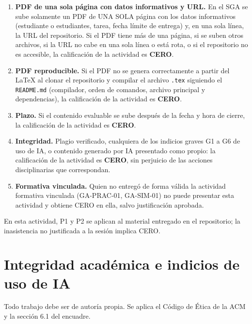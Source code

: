 \documentclass[11pt]{article}
\newcommand{\seccion}[1]{\section{\textcolor{utegreendk}{#1}}}
\begin{document}
\begin{cajapiso}[title={Criterios de piso: su incumplimiento implica calificación CERO en la actividad}]
	\begin{enumerate}[label=\textbf{P\arabic*.},leftmargin=24pt,itemsep=3pt]
		\item \textbf{PDF de una sola página con datos informativos y URL.} En el SGA se sube solamente un PDF de UNA SOLA página con los datos informativos (estudiante o estudiantes, tarea, fecha límite de entrega) y, en una sola línea, la URL del repositorio. Si el PDF tiene más de una página, si se suben otros archivos, si la URL no cabe en una sola línea o está rota, o si el repositorio no es accesible, la calificación de la actividad es \textbf{CERO}.
		\item \textbf{PDF reproducible.} Si el PDF no se genera correctamente a partir del \LaTeX{} al clonar el repositorio y compilar el archivo \texttt{.tex} siguiendo el \texttt{README.md} (compilador, orden de comandos, archivo principal y dependencias), la calificación de la actividad es \textbf{CERO}.
		\item \textbf{Plazo.} Si el contenido evaluable se sube después de la fecha y hora de cierre, la calificación de la actividad es \textbf{CERO}.
		\item \textbf{Integridad.} Plagio verificado, cualquiera de los indicios graves G1 a G6 de uso de IA, o contenido generado por IA presentado como propio: la calificación de la actividad es \textbf{CERO}, sin perjuicio de las acciones disciplinarias que correspondan.
		\item \textbf{Formativa vinculada.} Quien no entregó de forma válida la actividad formativa vinculada (GA-PRAC-01, GA-SIM-01) no puede presentar esta actividad y obtiene CERO en ella, salvo justificación aprobada.
	\end{enumerate}
	En esta actividad, P1 y P2 se aplican al material entregado en el repositorio; la inasistencia no justificada a la sesión implica CERO.
\end{cajapiso}

\seccion{Integridad académica e indicios de uso de IA}

Todo trabajo debe ser de autoría propia. Se aplica el Código de Ética de la ACM \citep{acm_code_2018} y la sección 6.1 del encuadre.
\end{document}
